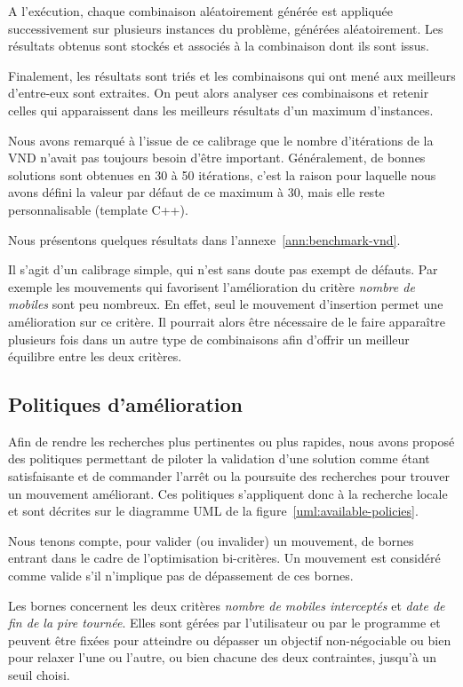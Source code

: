 				A l'exécution, chaque combinaison aléatoirement générée est appliquée successivement sur plusieurs instances du problème, générées aléatoirement. Les résultats obtenus sont stockés et associés à la combinaison dont ils sont issus.

				Finalement, les résultats sont triés et les combinaisons qui ont mené aux meilleurs d'entre-eux sont extraites. On peut alors analyser ces combinaisons et retenir celles qui apparaissent dans les meilleurs résultats d'un maximum d'instances.

				Nous avons remarqué à l'issue de ce calibrage que le nombre d'itérations de la VND n'avait pas toujours besoin d'être important. Généralement, de bonnes solutions sont obtenues en 30 à 50 itérations, c'est la raison pour laquelle nous avons défini la valeur par défaut de ce maximum à 30, mais elle reste personnalisable (template C++).

				Nous présentons quelques résultats dans l'annexe~\ref{ann:benchmark-vnd}.

				Il s'agit d'un calibrage simple, qui n'est sans doute pas exempt de défauts. Par exemple les mouvements qui favorisent l'amélioration du critère \emph{nombre de mobiles} sont peu nombreux. En effet, seul le mouvement d'insertion permet une amélioration sur ce critère. Il pourrait alors être nécessaire de le faire apparaître plusieurs fois dans un autre type de combinaisons afin d'offrir un meilleur équilibre entre les deux critères.

		\subsection{Politiques d'amélioration}
			Afin de rendre les recherches plus pertinentes ou plus rapides, nous avons proposé des politiques permettant de piloter la validation d'une solution comme étant satisfaisante et de commander l'arrêt ou la poursuite des recherches pour trouver un mouvement améliorant. Ces politiques s'appliquent donc à la recherche locale et sont décrites sur le diagramme UML de la figure~\ref{uml:available-policies}.

			Nous tenons compte, pour valider (ou invalider) un mouvement, de bornes entrant dans le cadre de l'optimisation bi-critères. Un mouvement est considéré comme valide s'il n'implique pas de dépassement de ces bornes. 

			Les bornes concernent les deux critères \emph{nombre de mobiles interceptés} et \emph{date de fin de la pire tournée}. Elles sont gérées par l'utilisateur ou par le programme et peuvent être fixées pour atteindre ou dépasser un objectif non-négociable ou bien pour relaxer l'une ou l'autre, ou bien chacune des deux contraintes, jusqu'à un seuil choisi.

